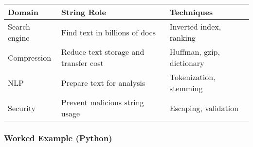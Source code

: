 \documentclass[
  letterpaper,
  DIV=11,
  numbers=noendperiod]{scrreprt}
\begin{document}
\begin{longtable}[]{@{}
  >{\raggedright\arraybackslash}p{}
  >{\raggedright\arraybackslash}p{}
  >{\raggedright\arraybackslash}p{}@{}}
\toprule\noalign{}
\begin{minipage}[b]{\linewidth}\raggedright
Domain
\end{minipage} & \begin{minipage}[b]{\linewidth}\raggedright
String Role
\end{minipage} & \begin{minipage}[b]{\linewidth}\raggedright
Techniques
\end{minipage} \\
\midrule\noalign{}
\endhead
\bottomrule\noalign{}
\endlastfoot
Search engine & Find text in billions of docs & Inverted index,
ranking \\
Compression & Reduce text storage and transfer cost & Huffman, gzip,
dictionary \\
NLP & Prepare text for analysis & Tokenization, stemming \\
Security & Prevent malicious string usage & Escaping, validation \\
\end{longtable}

\subsubsection{Worked Example (Python)}\label{worked-example-python-18}
\end{document}
